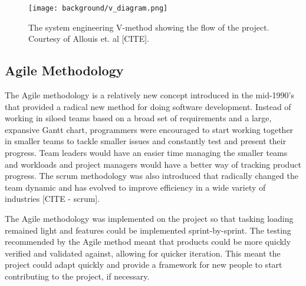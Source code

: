 \begin{figure}
    \centering
    \caption{The system engineering V-method showing the flow of the project.
    Courtesy of Allouis et. al [CITE].}
    \texttt{[image: background/v\_diagram.png]}
    \label{fig:v_method}
\end{figure}

\subsection*{Agile Methodology}
The Agile methodology is a relatively new concept introduced in the mid-1990's that provided a radical new method for doing software development.
Instead of working in siloed teams based on a broad set of requirements and a large, expansive Gantt chart, programmers were encouraged to start working together in smaller teams to tackle smaller issues and constantly test and present their progress.
Team leaders would have an easier time managing the smaller teams and workloads and project managers would have a better way of tracking product progress.
The scrum methodology was also introduced that radically changed the team dynamic and has evolved to improve efficiency in a wide variety of industries [CITE - scrum].

The Agile methodology was implemented on the project so that tasking loading remained light and features could be implemented sprint-by-sprint.
The testing recommended by the Agile method meant that products could be more quickly verified and validated against, allowing for quicker iteration.
This meant the project could adapt quickly and provide a framework for new people to start contributing to the project, if necessary.